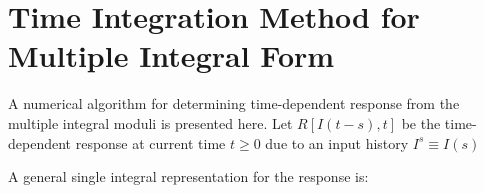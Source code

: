 
\section{Time Integration Method for Multiple Integral Form}
A numerical algorithm for determining time-dependent response from the multiple integral moduli is presented here. 
Let $R \left[ I(t-s),t \right] $ be the time-dependent response at current time $t \geq 0  $ due to an input history $I^s \equiv I(s) $

A general single integral representation for the response is: 

